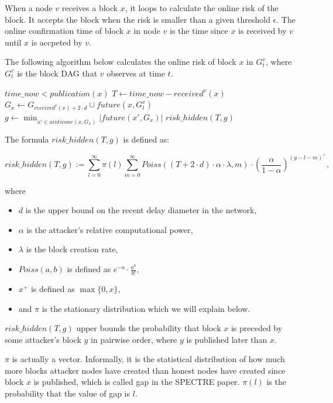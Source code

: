 \documentclass[a4paper,11pt]{article}
\begin{document}
When a node $v$ receives a block $x$, it loops to calculate the online risk of
the block. It accepts the block when the risk is smaller than a given threshold
$\epsilon$. The online confirmation time of block $x$ in node $v$ is the time
since $x$ is received by $v$ until $x$ is accpeted by $v$.

The following algorithm below calculates the online risk of block $x$ in
$G_t^v$, where $G_t^v$ is the block DAG that $v$ observes at time $t$.

\begin{codebox}
\li \If $time\_now < publication(x)$
\li   \Then
      \End
\li $T \gets time\_now - received^v(x)$
\li $G_x \gets G_{received^v(x) + 2 \cdot d} \cup future(x, G_t^v)$
\li $g \gets \min_{x' \in \overline{ainticone}(x,G_x)} |future(x',G_x)|$
\li \Return $risk\_hidden(T,g)$
\end{codebox}

The formula $risk\_hidden(T,g)$ is defined as:

$$
risk\_hidden(T,g) := \sum_{l=0}^{\infty} \pi(l) \sum_{m=0}^{\infty} Poiss((T + 2
\cdot d) \cdot \alpha \cdot \lambda, m) \cdot \left(\frac{\alpha}{1 -
\alpha}\right)^{(g - l - m)^+},
$$

where

\begin{itemize}
	\item $d$ is the upper bound on the recent delay diameter in the network,
	\item $\alpha$ is the attacker’s relative computational power,
	\item $\lambda$ is the block creation rate,
	\item $Poiss(a, b)$ is defined as $e^{-a} \cdot \frac{a^b}{b!}$,
	\item $x^+$ is defined as $\max\{0, x\}$,
	\item and $\pi$ is the stationary distribution which we will explain below.
\end{itemize}

$risk\_hidden(T,g)$ upper bounds the probability that block $x$ is preceded by
some attacker’s block $y$ in pairwise order, where $y$ is published later than
$x$. 

$\pi$ is actually a vector. Informally, it is the statistical distribution of
how much more blocks attacker nodes have created than honest nodes have created
since block $x$ is published, which is called gap in the SPECTRE paper. $\pi(l)$
is the probability that the value of gap is $l$.
\end{document}
